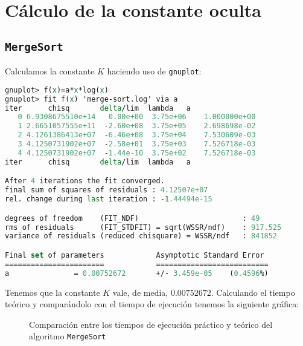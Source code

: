 \section{Cálculo de la constante oculta}\label{eficiencia-oculta}

\subsection{\texttt{MergeSort}}\label{eficiencia-oculta-mergesort}

Calculamos la constante $K$ haciendo uso de \texttt{gnuplot}:

\begin{lstlisting}[language=tcl]
gnuplot> f(x)=a*x*log(x)
gnuplot> fit f(x) 'merge-sort.log' via a
iter      chisq       delta/lim  lambda   a
   0 6.9308675510e+14   0.00e+00  3.75e+06    1.000000e+00
   1 2.6651057555e+11  -2.60e+08  3.75e+05    2.698698e-02
   2 4.1261386413e+07  -6.46e+08  3.75e+04    7.530609e-03
   3 4.1250731902e+07  -2.58e+01  3.75e+03    7.526718e-03
   4 4.1250731902e+07  -1.44e-10  3.75e+02    7.526718e-03
iter      chisq       delta/lim  lambda   a

After 4 iterations the fit converged.
final sum of squares of residuals : 4.12507e+07
rel. change during last iteration : -1.44494e-15

degrees of freedom    (FIT_NDF)                        : 49
rms of residuals      (FIT_STDFIT) = sqrt(WSSR/ndf)    : 917.525
variance of residuals (reduced chisquare) = WSSR/ndf   : 841852

Final set of parameters            Asymptotic Standard Error
=======================            ==========================
a               = 0.00752672       +/- 3.459e-05    (0.4596%)
\end{lstlisting}

Tenemos que la constante $K$ vale, de media, $0.00752672$.
Calculando el tiempo teórico y comparándolo con el tiempo de ejecución tenemos la siguiente gráfica:

\begin{figure}[h]
\begin{center}
\end{center}
\caption{Comparación entre los tiempos de ejecución práctico y teórico del algoritmo \texttt{MergeSort}}
\end{figure}


